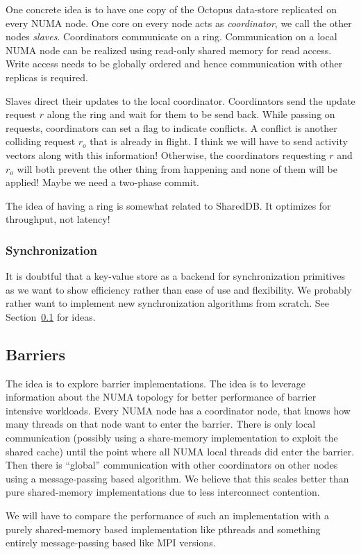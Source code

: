 \documentclass{article}
\begin{document}
One concrete idea is to have one copy of the Octopus data-store
replicated on every NUMA node. One core on every node acts as
\emph{coordinator}, we call the other nodes \emph{slaves}.
Coordinators communicate on a ring. Communication on a local NUMA node
can be realized using read-only shared memory for read access. Write
access needs to be globally ordered and hence communication with other
replicas is required. 

Slaves direct their updates to the local coordinator. Coordinators
send the update request $r$ along the ring and wait for them to be
send back. While passing on requests, coordinators can set a flag to
indicate conflicts. A conflict is another colliding request $r_o$ that
is already in flight. I think we will have to send activity vectors
along with this information! Otherwise, the coordinators requesting
$r$ and $r_o$ will both prevent the other thing from happening and
none of them will be applied! Maybe we need a two-phase commit.

The idea of having a ring is somewhat related to SharedDB. It
optimizes for throughput, not latency!

\subsubsection{Synchronization}

It is doubtful that a key-value store as a backend for synchronization
primitives as we want to show efficiency rather than ease of use and
flexibility. We probably rather want to implement new synchronization
algorithms from scratch. See Section~\ref{barriers} for ideas.

\subsection{Barriers}
\label{barriers}

The idea is to explore barrier implementations. The idea is to
leverage information about the NUMA topology for better performance of
barrier intensive workloads. Every NUMA node has a coordinator node,
that knows how many threads on that node want to enter the
barrier. There is only local communication (possibly using a
share-memory implementation to exploit the shared cache) until the
point where all NUMA local threads did enter the barrier.  Then there
is ``global'' communication with other coordinators on other nodes
using a message-passing based algorithm. We believe that this scales
better than pure shared-memory implementations due to less
interconnect contention.

We will have to compare the performance of such an implementation with
a purely shared-memory based implementation like pthreads and
something entirely message-passing based like MPI versions.

\newpage



\label{LastPage}
\end{document}
